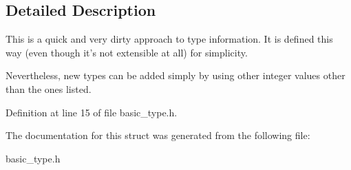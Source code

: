 \subsection{Detailed Description}
This is a quick and very dirty approach to type information. It is defined this way (even though it's not extensible at all) for simplicity.

Nevertheless, new types can be added simply by using other integer values other than the ones listed. 

Definition at line 15 of file basic\+\_\+type.\+h.



The documentation for this struct was generated from the following file\+:\begin{DoxyCompactItemize}
\item 
basic\+\_\+type.\+h\end{DoxyCompactItemize}
